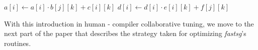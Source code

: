\begin{algorithm}[h]
\small{
	\caption{}
 	\label{alg:example3}                       
 	\begin{algorithmic}[0]
					\State $a[i] \leftarrow a[i] \cdot b[j][k] + c[i][k]$
					\State $d[i] \leftarrow d[i] \cdot e[i][k] + f[j][k]$
				\EndFor
			\EndFor
    	\EndFor
 	\end{algorithmic}
}
\end{algorithm}

\setcounter{algorithm}{0}

With this introduction in human - compiler collaborative tuning, we move to the
next part of the paper that describes the strategy taken for optimizing
\textit{fastsg}'s routines.
